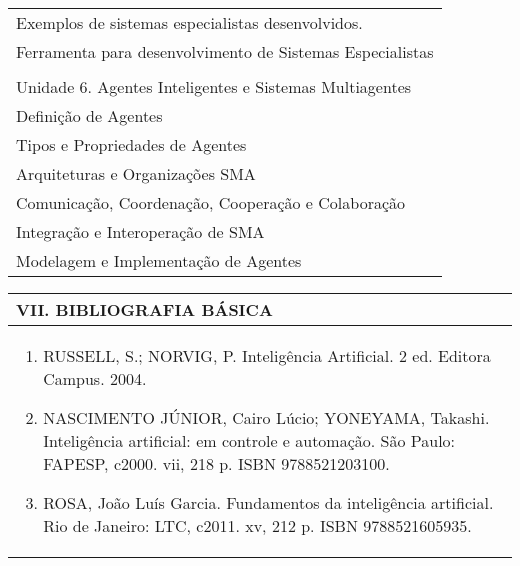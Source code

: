 \documentclass[12pt]{article}
\begin{document}
\begin{longtable}{|L{1.025\textwidth}|}
            Exemplos de sistemas especialistas desenvolvidos.\\
            Ferramenta para desenvolvimento de Sistemas Especialistas\\
\\
Unidade 6.  Agentes Inteligentes e Sistemas Multiagentes\\
 Definição de Agentes\\
 Tipos e Propriedades de Agentes\\
 Arquiteturas e Organizações SMA\\
 Comunicação, Coordenação, Cooperação e Colaboração\\
 Integração e Interoperação de SMA\\
             Modelagem e Implementação de Agentes
\\ \hline
\end{longtable} 


\begin{longtable}{|L{1.025\textwidth}|} \hline
%
{\bf VII. BIBLIOGRAFIA BÁSICA} \\ \hline
\begin{enumerate}
%
\item RUSSELL, S.; NORVIG, P. Inteligência Artificial. 2 ed. Editora Campus. 2004. 
\item NASCIMENTO JÚNIOR, Cairo Lúcio; YONEYAMA, Takashi. Inteligência artificial: em controle e automação. São Paulo: FAPESP, c2000. vii, 218 p. ISBN 9788521203100.
\item ROSA, João Luís Garcia. Fundamentos da inteligência artificial. Rio de Janeiro: LTC, c2011. xv, 212 p. ISBN 9788521605935.

\end{enumerate}
 \\ \hline
\end{longtable}


\end{document}
